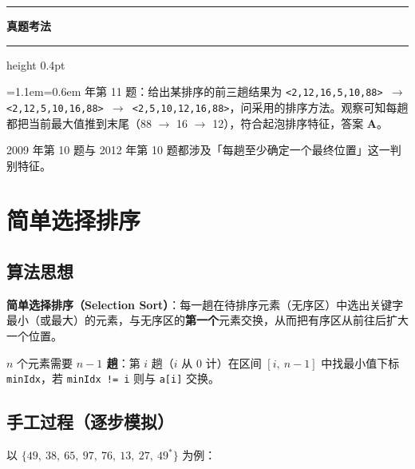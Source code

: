 \documentclass[11pt,openany,UTF8]{ctexbook}
\newcommand{\callouthead}[2]{%
  \par\addvspace{7pt}\noindent
  {\color{#1}\rule[-0.15em]{3pt}{1.05em}}\hspace{0.5em}%
  {\bfseries\color{#1}#2}\par\nobreak\vspace{-0.35em}%
  {\color{rulesep}\hrule height 0.4pt}\nobreak\vspace{0.45em}%
  \begingroup\small\setlength{\parindent}{0pt}%
  \leftskip=1.1em\rightskip=0.6em\noindent\ignorespaces}
\newcommand{\calloutend}{\par\endgroup\addvspace{7pt}}
\newenvironment{callexam}[1]{\callouthead{exambar}{#1}}{\calloutend}
\begin{document}
\begin{callexam}{真题考法}
2010 年第 11 题：给出某排序的前三趟结果为 \texttt{<\allowbreak{}2,\allowbreak{}12,\allowbreak{}16,\allowbreak{}5,\allowbreak{}10,\allowbreak{}88>\allowbreak{} $\to$ <\allowbreak{}2,\allowbreak{}12,\allowbreak{}5,\allowbreak{}10,\allowbreak{}16,\allowbreak{}88>\allowbreak{} $\to$ <\allowbreak{}2,\allowbreak{}5,\allowbreak{}10,\allowbreak{}12,\allowbreak{}16,\allowbreak{}88>\allowbreak{}}，问采用的排序方法。观察可知每趟都把当前最大值推到末尾（88 $\to$ 16 $\to$ 12），符合起泡排序特征，答案 \textbf{A}。

2009 年第 10 题与 2012 年第 10 题都涉及「每趟至少确定一个最终位置」这一判别特征。

\end{callexam}

\section{简单选择排序}

\subsection{算法思想}

\textbf{简单选择排序（Selection Sort）}：每一趟在待排序元素（无序区）中选出关键字最小（或最大）的元素，与无序区的\textbf{第一个}元素交换，从而把有序区从前往后扩大一个位置。

$n$ 个元素需要 \textbf{$n-1$ 趟}：第 $i$ 趟（$i$ 从 0 计）在区间 $[i,\ n-1]$ 中找最小值下标 \texttt{minIdx}，若 \texttt{minIdx !=\allowbreak{} i} 则与 \texttt{a[i]\allowbreak{}} 交换。

\subsection{手工过程（逐步模拟）}

以 $\{49,\ 38,\ 65,\ 97,\ 76,\ 13,\ 27,\ 49^*\}$ 为例：
\end{document}
